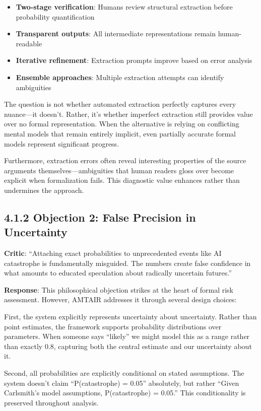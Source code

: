 \documentclass[
  11pt,
  letterpaper,
  openany]{book}
\providecommand{\tightlist}{%
  \setlength{\itemsep}{0pt}\setlength{\parskip}{0pt}}
\begin{document}
\begin{itemize}
\tightlist
\item
  \textbf{Two-stage verification}: Humans review structural extraction
  before probability quantification
\item
  \textbf{Transparent outputs}: All intermediate representations remain
  human-readable
\item
  \textbf{Iterative refinement}: Extraction prompts improve based on
  error analysis
\item
  \textbf{Ensemble approaches}: Multiple extraction attempts can
  identify ambiguities
\end{itemize}

The question is not whether automated extraction perfectly captures
every nuance---it doesn't. Rather, it's whether imperfect extraction
still provides value over no formal representation. When the alternative
is relying on conflicting mental models that remain entirely implicit,
even partially accurate formal models represent significant progress.

Furthermore, extraction errors often reveal interesting properties of
the source arguments themselves---ambiguities that human readers gloss
over become explicit when formalization fails. This diagnostic value
enhances rather than undermines the approach.

\subsection{4.1.2 Objection 2: False Precision in
Uncertainty}\label{sec-false-precision}

\textbf{Critic}: ``Attaching exact probabilities to unprecedented events
like AI catastrophe is fundamentally misguided. The numbers create false
confidence in what amounts to educated speculation about radically
uncertain futures.''

\textbf{Response}: This philosophical objection strikes at the heart of
formal risk assessment. However, AMTAIR addresses it through several
design choices:

First, the system explicitly represents uncertainty about uncertainty.
Rather than point estimates, the framework supports probability
distributions over parameters. When someone says ``likely'' we might
model this as a range rather than exactly 0.8, capturing both the
central estimate and our uncertainty about it.

Second, all probabilities are explicitly conditional on stated
assumptions. The system doesn't claim ``P(catastrophe) = 0.05''
absolutely, but rather ``Given Carlsmith's model assumptions,
P(catastrophe) = 0.05.'' This conditionality is preserved throughout
analysis.
\end{document}
